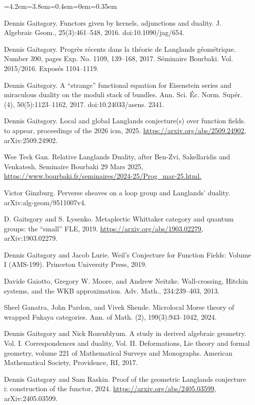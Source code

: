 \begin{list}{}{\leftmargin=4.2em=3.8em=0.4em\itemindent=0em\parsep=0.35em}
\item[{Gai16}] Dennis Gaitsgory. Functors given by kernels, adjunctions and duality. J. Algebraic Geom., 25(3):461–548, 2016. doi:10.1090/jag/654.
\item[{Gai17a}] Dennis Gaitsgory. Progrès récents dans la théorie de Langlands géométrique. Number 390, pages Exp. No. 1109, 139–168, 2017. Séminaire Bourbaki. Vol. 2015/2016. Exposés 1104–1119.
\item[{Gai17b}] Dennis Gaitsgory. A “strange” functional equation for Eisenstein series and miraculous duality on the moduli stack of bundles. Ann. Sci. Éc. Norm. Supér. (4), 50(5):1123–1162, 2017. doi:10.24033/asens. 2341.
\item[{Gai25}] Dennis Gaitsgory. Local and global Langlands conjecture(s) over function fields. to appear, proceedings of the 2026 icm, 2025. \url{https://arxiv.org/abs/2509.24902}, arXiv:2509.24902.
\item[{Gan}] Wee Teck Gan. Relative Langlands Duality, after Ben-Zvi, Sakellaridis and Venkatesh. Seminaire Bourbaki 29 Mars 2025, \url{https://www.bourbaki.fr/seminaires/2024-25/Prog\_mar-25.html.}
\item[{Gin}] Victor Ginzburg. Perverse sheaves on a loop group and Langlands’ duality. arXiv:alg-geom/9511007v4.
\item[{GL19a}] D. Gaitsgory and S. Lysenko. Metaplectic Whittaker category and quantum groups: the “small” FLE, 2019. \url{https://arxiv.org/abs/1903.02279}, arXiv:1903.02279.
\item[{GL19b}] Dennis Gaitsgory and Jacob Lurie. Weil’s Conjecture for Function Fields: Volume I (AMS-199). Princeton University Press, 2019.
\item[{GMN13}] Davide Gaiotto, Gregory W. Moore, and Andrew Neitzke. Wall-crossing, Hitchin systems, and the WKB approximation. Adv. Math., 234:239–403, 2013.
\item[{GPS24}] Sheel Ganatra, John Pardon, and Vivek Shende. Microlocal Morse theory of wrapped Fukaya categories. Ann. of Math. (2), 199(3):943–1042, 2024.
\item[{GR17}] Dennis Gaitsgory and Nick Rozenblyum. A study in derived algebraic geometry. Vol. I. Correspondences and duality, Vol. II. Deformations, Lie theory and formal geometry, volume 221 of Mathematical Surveys and Monographs. American Mathematical Society, Providence, RI, 2017.
\item[{GR24a}] Dennis Gaitsgory and Sam Raskin. Proof of the geometric Langlands conjecture i: construction of the functor, 2024. \url{https://arxiv.org/abs/2405.03599}, arXiv:2405.03599.

\end{list}
